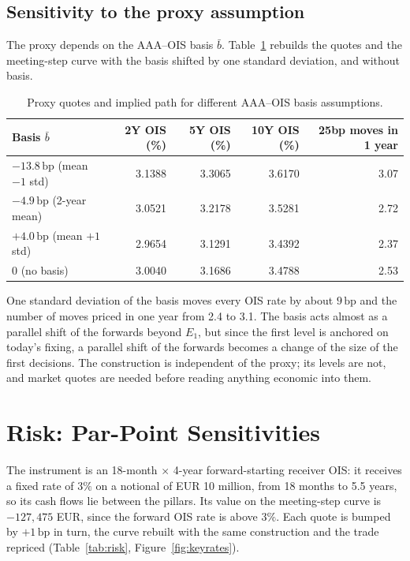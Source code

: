 \documentclass[11pt,a4paper]{article}
\theoremstyle{plain}
\theoremstyle{definition}
\newcommand{\bp}{\,\mathrm{bp}}
\begin{document}
\subsection{Sensitivity to the proxy assumption}
\label{sec:proxy-sensitivity}
The proxy depends on the AAA--OIS basis $\bar b$. Table~\ref{tab:proxy-sensitivity} rebuilds the quotes and the meeting-step curve with the basis shifted by one standard deviation, and without basis.

\begin{table}[htbp]
\centering
\small
\begin{tabular}{@{}lrrrr@{}}
\toprule
Basis $\bar b$ & 2Y OIS (\%) & 5Y OIS (\%) & 10Y OIS (\%) & 25bp moves in 1 year \\
\midrule
$-13.8\bp$ (mean $-1$ std) & 3.1388 & 3.3065 & 3.6170 & 3.07 \\
$-4.9\bp$ (2-year mean) & 3.0521 & 3.2178 & 3.5281 & 2.72 \\
$+4.0\bp$ (mean $+1$ std) & 2.9654 & 3.1291 & 3.4392 & 2.37 \\
$0$ (no basis) & 3.0040 & 3.1686 & 3.4788 & 2.53 \\
\bottomrule
\end{tabular}
\caption{Proxy quotes and implied path for different AAA--OIS basis assumptions.}
\label{tab:proxy-sensitivity}
\end{table}

One standard deviation of the basis moves every OIS rate by about $9\bp$ and the number of moves priced in one year from 2.4 to 3.1. The basis acts almost as a parallel shift of the forwards beyond $E_1$, but since the first level is anchored on today's fixing, a parallel shift of the forwards becomes a change of the size of the first decisions. The construction is independent of the proxy; its levels are not, and market quotes are needed before reading anything economic into them.

\clearpage
\section{Risk: Par-Point Sensitivities}
\label{sec:risk}

The instrument is an 18-month $\times$ 4-year forward-starting receiver OIS: it receives a fixed rate of $3\%$ on a notional of EUR 10 million, from 18 months to 5.5 years, so its cash flows lie between the pillars. Its value on the meeting-step curve is $-127{,}475$ EUR, since the forward OIS rate is above $3\%$. Each quote is bumped by $+1\bp$ in turn, the curve rebuilt with the same construction and the trade repriced (Table~\ref{tab:risk}, Figure~\ref{fig:keyrates}).
\end{document}
